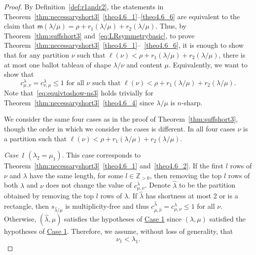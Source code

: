 \documentclass[10pt]{article}
\theoremstyle{definition}
\newcommand{\msf}{\mathsf{m}}
\let\hypertargeta\hypertarget %
\let\hyperlinka\hyperlink %
\newenvironment{Case}[1]{\par\vskip2pt\noindent%
\emph{#1}.}{\vskip2pt}
\begin{document}
\begin{proof}
By Definition~\ref{def:r1andr2}, the statements in Theorem~\ref{thm:necessaryshort3}~\ref{theo4.6_1}--\ref{theo4.6_6} are equivalent to the claim that $\msf (\lambda/\mu)=\rho + r_1(\lambda / \mu) + r_2 (\lambda / \mu)$. Thus, by Theorem~\ref{thm:suffshort3} and~\eqref{eq:LRsymmetrybasic}, to prove Theorem~\ref{thm:necessaryshort3}~\ref{theo4.6_1}--~\ref{theo4.6_6}, it is enough to show that for any partition $\nu$ such that $\ell(\nu) < \rho + r_1(\lambda / \mu) + r_2 (\lambda / \mu)$, there is at most one ballot tableau of shape $\lambda/\nu$ and content $\mu$. Equivalently, we want to show that
\begin{equation}
\label{eq:equivtoshow-ns3}
c^{\lambda}_{\mu,\nu} = c^{\lambda}_{\nu,\mu}\leq 1\text{ for all }\nu\text{ such that } \ell(\nu) < \rho + r_1(\lambda / \mu) + r_2 (\lambda / \mu).
\end{equation}
Note that~\eqref{eq:equivtoshow-ns3} holds trivially for Theorem~\ref{thm:necessaryshort3}~\ref{theo4.6_4} since $\lambda/ \mu$ is $n$-sharp.


We consider the same four cases as in the proof of Theorem~\ref{thm:suffshort3}, though the order in which we consider the cases is different. In all four cases $\nu$ is a partition such that $\ell(\nu) < \rho + r_1(\lambda / \mu) + r_2 (\lambda / \mu)$.

\begin{Case}
{\hypertargeta{theo4.6_case1}{Case 1} $(\lambda_2 = \mu_1)$} This case corresponds to Theorem~\ref{thm:necessaryshort3}~\ref{theo4.6_1} and~\ref{theo4.6_2}. If the first $l$ rows of $\nu$ and $\lambda$ have the same length, for some $l\in \mathbb{Z}_{>0}$, then removing the top $l$ rows of both $\lambda$ and $\nu$ does not change the value of $c^\lambda_{\mu,\nu}$. Denote $\widehat \lambda$ to be the partition obtained by removing the top $l$ rows of $\lambda$. If $\widehat \lambda$ has shortness at most 2 or is a rectangle, then $s_{\widehat \lambda/\mu}$ is multiplicity-free and thus $c^{\widehat \lambda}_{\mu,\widehat \nu} = c^\lambda_{\mu,\nu} \leq 1$ for all $\nu$. Otherwise, $(\widehat \lambda,\mu)$ satisfies the hypotheses of \hyperlinka{theo4.6_case1}{Case 1} since $(\lambda,\mu)$ satisfied the hypotheses of \hyperlinka{theo4.6_case1}{Case 1}.
Therefore, we assume, without loss of generality, that 
\begin{equation}
\label{eq:nu1<la1}
 \nu_1<\lambda_1.
\end{equation}


\end{Case}
\end{proof}
\end{document}
